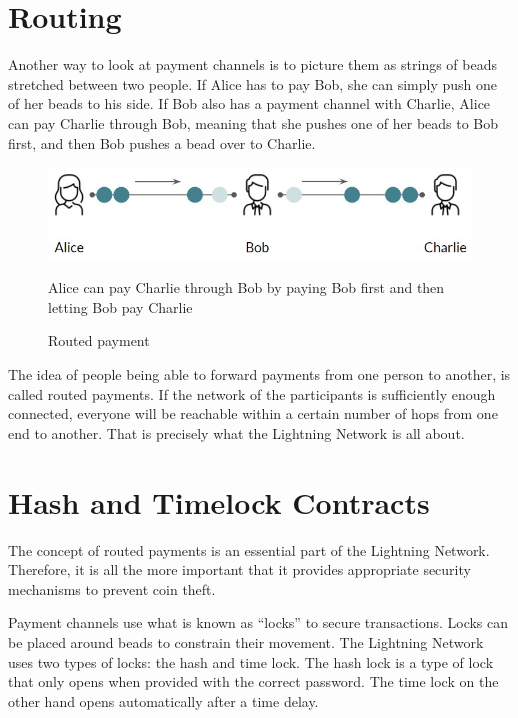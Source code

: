 \documentclass[a4paper, 12pt]{report}
\begin{document}
\section{Routing}
\par Another way to look at payment channels is to picture them as strings of beads stretched between two people. If Alice has to pay Bob, she can simply push one of her beads to his side. If Bob also has a payment channel with Charlie, Alice can pay Charlie through Bob, meaning that she pushes one of her beads to Bob first, and then Bob pushes a bead over to Charlie.

\begin{figure}[H]
	\centering
	\includegraphics[width=12cm]{07_Beads}
	\caption{Routed payment}
	\medskip
	\small Alice can pay Charlie through Bob by paying Bob first and then letting Bob pay Charlie
	\label{fig:07_Beads}
\end{figure}

\par The idea of people being able to forward payments from one person to another, is called routed payments. If the network of the participants is sufficiently enough connected, everyone will be reachable within a certain number of hops from one end to another. That is precisely what the Lightning Network is all about.

\section{Hash and Timelock Contracts}
\par The concept of routed payments is an essential part of the Lightning Network. Therefore, it is all the more important that it provides appropriate security mechanisms to prevent coin theft.
\par Payment channels use what is known as “locks” to secure transactions. Locks can be placed around beads to constrain their movement. The Lightning Network uses two types of locks: the hash and time lock. The hash lock is a type of lock that only opens when provided with the correct password. The time lock on the other hand opens automatically after a time delay.
\end{document}
